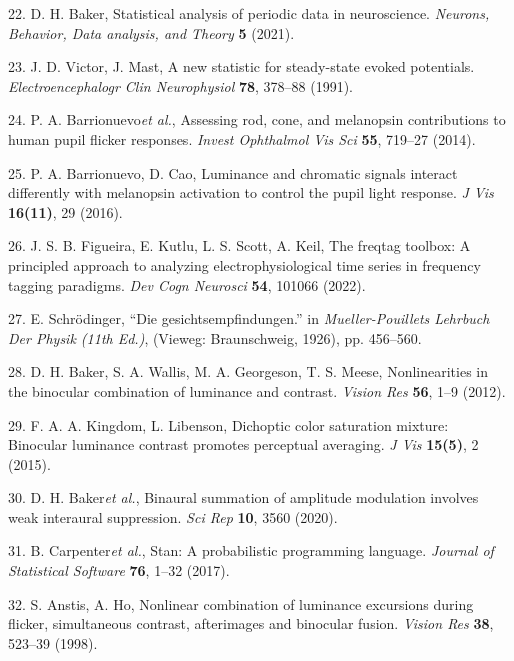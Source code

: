 \documentclass[
]{article}
\begin{document}
\leavevmode\hypertarget{ref-Baker2021}{}%
22. D. H. Baker, Statistical analysis of periodic data in neuroscience. \emph{Neurons, Behavior, Data analysis, and Theory} \textbf{5} (2021).

\leavevmode\hypertarget{ref-Victor1991}{}%
23. J. D. Victor, J. Mast, A new statistic for steady-state evoked potentials. \emph{Electroencephalogr Clin Neurophysiol} \textbf{78}, 378--88 (1991).

\leavevmode\hypertarget{ref-Barrionuevo2014}{}%
24. P. A. Barrionuevo\emph{et al.}, Assessing rod, cone, and melanopsin contributions to human pupil flicker responses. \emph{Invest Ophthalmol Vis Sci} \textbf{55}, 719--27 (2014).

\leavevmode\hypertarget{ref-Barrionuevo2016}{}%
25. P. A. Barrionuevo, D. Cao, Luminance and chromatic signals interact differently with melanopsin activation to control the pupil light response. \emph{J Vis} \textbf{16(11)}, 29 (2016).

\leavevmode\hypertarget{ref-Figueira2022}{}%
26. J. S. B. Figueira, E. Kutlu, L. S. Scott, A. Keil, The freqtag toolbox: A principled approach to analyzing electrophysiological time series in frequency tagging paradigms. \emph{Dev Cogn Neurosci} \textbf{54}, 101066 (2022).

\leavevmode\hypertarget{ref-Schrodinger1926}{}%
27. E. Schrödinger, ``Die gesichtsempfindungen.'' in \emph{Mueller-Pouillets Lehrbuch Der Physik (11th Ed.)}, (Vieweg: Braunschweig, 1926), pp. 456--560.

\leavevmode\hypertarget{ref-Baker2012}{}%
28. D. H. Baker, S. A. Wallis, M. A. Georgeson, T. S. Meese, Nonlinearities in the binocular combination of luminance and contrast. \emph{Vision Res} \textbf{56}, 1--9 (2012).

\leavevmode\hypertarget{ref-Kingdom2015}{}%
29. F. A. A. Kingdom, L. Libenson, Dichoptic color saturation mixture: Binocular luminance contrast promotes perceptual averaging. \emph{J Vis} \textbf{15(5)}, 2 (2015).

\leavevmode\hypertarget{ref-Baker2020}{}%
30. D. H. Baker\emph{et al.}, Binaural summation of amplitude modulation involves weak interaural suppression. \emph{Sci Rep} \textbf{10}, 3560 (2020).

\leavevmode\hypertarget{ref-Carpenter2017}{}%
31. B. Carpenter\emph{et al.}, Stan: A probabilistic programming language. \emph{Journal of Statistical Software} \textbf{76}, 1--32 (2017).

\leavevmode\hypertarget{ref-Anstis1998}{}%
32. S. Anstis, A. Ho, Nonlinear combination of luminance excursions during flicker, simultaneous contrast, afterimages and binocular fusion. \emph{Vision Res} \textbf{38}, 523--39 (1998).
\end{document}
